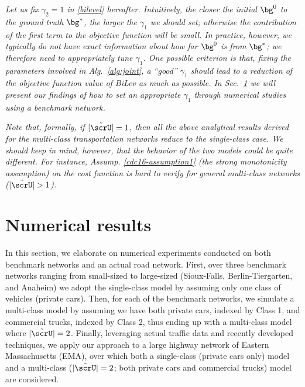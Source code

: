 \documentclass[3p]{elsarticle}
\begin{document}
\begin{rmk} \label{rem:gamma1} \em{Let us fix $\gamma_2=1$ in
    \eqref{bilevel} hereafter. Intuitively, the closer the initial
    $\bg^0$ to the ground truth $\bg^*$, the larger the $\gamma_1$ we
    should set; otherwise the contribution of the first term to the
    objective function will be small. In practice, however, we typically
    do not have exact information about how far $\bg^0$ is from $\bg^*$;
    we therefore need to appropriately tune $\gamma_1$. One possible
    criterion is that, fixing the parameters involved in
    Alg.~\ref{alg:joint}, a ``good'' $\gamma_1$ should lead to a
    reduction of the objective function value of BiLev as much as
    possible.  In Sec.~\ref{sec:num} we will present our findings of how
    to set an appropriate $\gamma_1$ through numerical studies using a
    benchmark network.}
\end{rmk}

	
\begin{rmk}
  \em{Note that, formally, if $|\tilde \scrU| = 1$, then all the above
    analytical results derived for the multi-class transportation
    networks reduce to the single-class case. We should keep in mind,
    however, that the behavior of the two models could be quite
    different. For instance, Assump. \ref{cdc16-assumption1} (the strong
    monotonicity assumption) on the cost function is hard to verify
    for general multi-class networks ($|\tilde \scrU| > 1$).}
\end{rmk}
	
	
\section{Numerical results} \label{sec:num}


In this section, we elaborate on numerical experiments conducted on both
benchmark networks \cite{BarGera16} and an actual road network. First,
over three benchmark networks ranging from small-sized to large-sized
(Sioux-Falls, Berlin-Tiergarten, and Anaheim) we adopt the single-class
model by assuming only one class of vehicles (private cars). Then, for
each of the benchmark networks, we simulate a multi-class model by
assuming we have both private cars, indexed by Class 1, and commercial
trucks, indexed by Class 2, thus ending up with a multi-class model
where $|\tilde \scrU| = 2$. Finally, leveraging actual traffic data and
recently developed techniques, we apply our approach to a large highway
network of Eastern Massachusetts (EMA), over which both a single-class
(private cars only) model and a multi-class ($|\tilde \scrU| = 2$; both
private cars and commercial trucks) model are considered.
\end{document}
